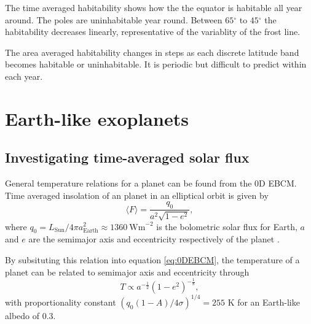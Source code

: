 \documentclass[12pt, onecolumn]{revtex4-2}    %
\newcommand{\degrees}{\ensuremath{^{\circ}}}
\begin{document}
The time averaged habitability shows how the the equator is habitable all year around.
The poles are uninhabitable year round.
Between $65\degrees$ to $45\degrees$ the habitability decreases linearly, representative of the variablity of the frost line.

The area averaged habitability changes in steps as each discrete latitude band becomes habitable or uninhabitable.
It is periodic but difficult to predict within each year.

\section{Earth-like exoplanets} \label{sec:Exoplanets}
\subsection{Investigating time-averaged solar flux} \label{ssec:InvTimeAveragedSolarFlux}
General temperature relations for a planet can be found from the 0D EBCM.
Time averaged insolation of an planet in an elliptical orbit is given by
\begin{equation}
  \langle F \rangle = \frac{q_0}{a^2 \sqrt{1-e^2}} \label{eq:avgInsolation},
\end{equation}
where $q_0 = L_{\text{Sun}}/4\pi a_{\text{Earth}}^2 \approx 1360 \ \text{Wm}^{-2}$ is the bolometric solar flux for Earth, $a$ and $e$ are the semimajor axis and eccentricity respectively of the planet \cite{Mendez2017}.

By subsituting this relation into equation \eqref{eq:0DEBCM}, the temperature of a planet can be related to semimajor axis and eccentricity through
\begin{equation}
  T \propto a^{-\frac{1}{2}} (1-e^2)^{-\frac{1}{8}}, \label{eq:T_propto_a_e}
\end{equation}
with proportionality constant $(q_0 (1-A) / 4\sigma)^{1/4} = 255$ K for an Earth-like albedo of 0.3.
\end{document}
